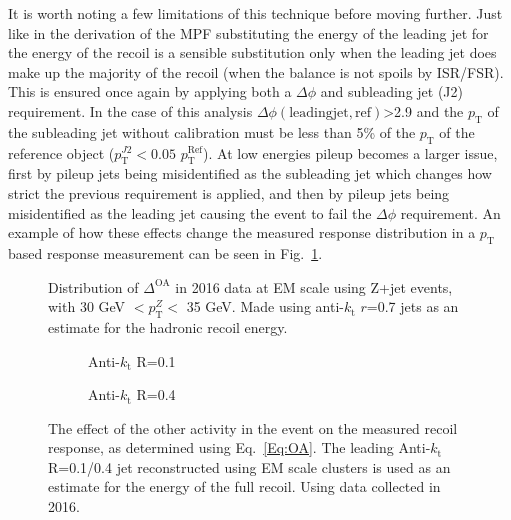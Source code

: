 It is worth noting a few limitations of this technique before moving further.  
Just like in the derivation of the MPF substituting the energy of the leading jet for the energy of the recoil is a sensible substitution only when the leading jet does make up the majority of the recoil (when the balance is not spoils by ISR/FSR).  
This is ensured once again by applying both a $\Delta\phi$ and subleading jet (J2) requirement.  
In the case of this analysis $\Delta\phi\left(\mathrm{leading jet, ref}\right)$>2.9 and the $p_{\mathrm T}$ of the subleading jet without calibration must be less than 5\% of the $p_{\mathrm T}$ of the reference object ($p_{\mathrm T}^{J2}<0.05$ $p_{\mathrm T}^{\mathrm{Ref}}$).  
At low energies pileup becomes a larger issue, first by pileup jets being misidentified as the subleading jet which changes how strict the previous requirement is applied, and then by pileup jets being misidentified as the leading jet causing the event to fail the $\Delta\phi$ requirement.  
An example of how these effects change the measured response distribution in a $p_{\mathrm T}$ based response measurement can be seen in Fig.~\ref{Fig:BalDistExample}.  

\begin{figure}[!ht]
 \begin{center}
  \scalebox{0.55}{
   \texttt{[image: plots/Chap6/OtherActivity/Dists/OADist\_Cone7\_Bin3.eps]}
  }
 \end{center}
 \caption[Example $\Delta^{\mathrm{OA}}$ distribution]
 {\small Distribution of $\Delta^{\mathrm{OA}}$ in 2016 data at EM scale using Z+jet events, with 30 GeV $< p_{\mathrm T}^Z <$ 35 GeV.  Made using anti-$k_{\mathrm t}$ $r$=0.7 jets as an estimate for the hadronic recoil energy.  }
 \label{Fig:BalDistExample}
\end{figure}


\begin{figure}[!ht]
  \centering
  \begin{subfigure}{.5\textwidth}
    \centering
    \caption{Anti-$k_\mathrm{t}$ R=0.1}
  \end{subfigure}%
  \begin{subfigure}{.5\textwidth}  \centering
    \caption{Anti-$k_\mathrm{t}$ R=0.4}
  \end{subfigure}
  \caption[$\Delta^{\mathrm{OA}}$ using Anti-$k_\mathrm{t}$ R=0.1/0.4 jets]
{\small The effect of the other activity in the event on the measured recoil response, as determined using Eq.~\ref{Eq:OA}.  The leading Anti-$k_\mathrm{t}$ R=0.1/0.4 jet reconstructed using EM scale clusters is used as an estimate for the energy of the full recoil.  Using data collected in 2016.  }
  \label{Fig:OA_1-4}
\end{figure}


